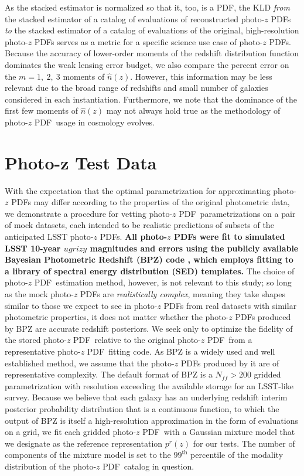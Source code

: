 \documentclass[\docopts]{\docclass}
\newcommand{\pz}{photo-$z$ PDF}
\begin{document}
As the stacked estimator is normalized so that it, too, is a PDF, the KLD 
\textit{from} the stacked estimator of a catalog of evaluations of 
reconstructed \pz s \textit{to} the stacked estimator of a catalog of 
evaluations of the original, high-resolution \pz s serves as a metric for a 
specific science use case of \pz s.
Because the accuracy of lower-order moments of the redshift distribution 
function dominates the weak lensing error budget, we also compare the percent 
error on the $m=1,\ 2,\ 3$ moments of $\hat{n}(z)$.
However, this information may be less relevant due to the broad range of 
redshifts and small number of galaxies considered in each instantiation.
Furthermore, we note that the dominance of the first few moments of 
$\hat{n}(z)$ may not always hold true as the methodology of \pz\ usage in 
cosmology evolves.


\section{Photo-z Test Data}
\label{sec:data}

With the expectation that the optimal parametrization for approximating \pz s 
may differ according to the properties of the original photometric data, we 
demonstrate a procedure for vetting \pz\ parametrizations on a pair of mock 
datasets, each intended to be realistic predictions of subsets of the 
anticipated LSST \pz s.
\textbf{All \pz s were fit to simulated LSST 10-year $ugrizy$ magnitudes and 
errors \citep{ivezic_lsst:_2008} using the publicly available Bayesian 
Photometric Redshift (BPZ) code \citep{benitez_bayesian_2000}, which employs 
fitting to a library of spectral energy distribution (SED) templates.}
The choice of \pz\ estimation method, however, is not relevant to this study; 
so long as the mock \pz s are \textit{realistically complex}, meaning they take 
shapes similar to those we expect to see in \pz s from real datasets with 
similar photometric properties, it does not matter whether the \pz s produced 
by BPZ are accurate redshift posteriors.
We seek only to optimize the fidelity of the stored \pz\ relative to the 
original \pz\ from a representative \pz\ fitting code.
\citep[See][Schmidt, et al.\ in preparation for other work comparing the 
accuracy of \pz s produced by different methods.]{tanaka_photometric_2017, 
de_jong_third_2017, amaro_metaphor:_2016}
As BPZ is a widely used and well established method, we assume that the \pz s 
produced by it are of representative complexity.
The default format of BPZ is a $N_{ff}>200$ gridded parametrization with 
resolution exceeding the available storage for an LSST-like survey.
Because we believe that each galaxy has an underlying redshift interim 
posterior probability distribution that is a continuous function, to which the 
output of BPZ is itself a high-resolution approximation in the form of 
evaluations on a grid, we fit each gridded \pz\ with a Gaussian mixture model 
that we designate as the reference representation $p^{r}(z)$ for our tests.
The number of components of the mixture model is set to the $99^{\mathrm{th}}$ 
percentile of the modality distribution of the \pz\ catalog in question.
\end{document}
